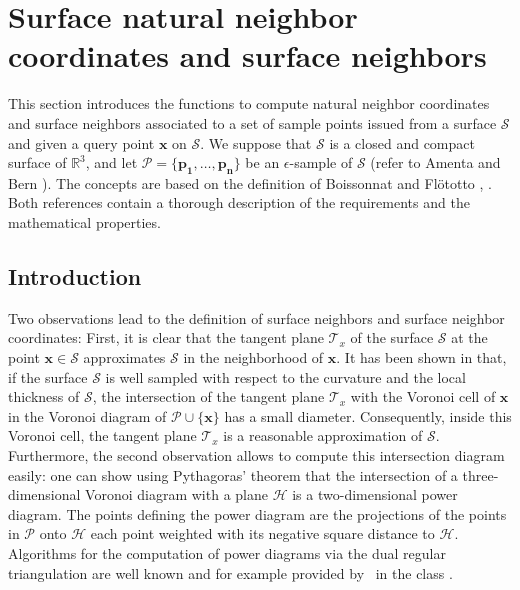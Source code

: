 \section{Surface natural neighbor coordinates and surface neighbors}\label{sec:surface}

This section introduces the functions to compute natural neighbor
coordinates and surface neighbors associated to a set of sample points
issued from a surface $\mathcal{S}$ and given a query point
$\mathbf{x}$ on $\mathcal{S}$. We suppose that $\mathcal{S}$ is a
closed and compact surface of $\mathbb{R}^3$, and let $\mathcal{P}=
\{\mathbf{p_1}, \ldots,\mathbf{p_n}\}$ be an $\epsilon$-sample of
$\mathcal{S}$ (refer to Amenta and Bern \cite{ab-srvf-99}). The
concepts are based on the definition of Boissonnat and Fl\"ototto
\cite{bf-lcss-02}, \cite{prisme-these-flototto}.  Both references
contain a thorough description of the requirements and the
mathematical properties.

\subsection{Introduction}

Two observations lead to the definition of surface neighbors and
surface neighbor coordinates: First, it is clear that the tangent
plane $\mathcal{T}_x$ of the surface $\mathcal{S}$ at the point
$\mathbf{x} \in \mathcal{S}$ approximates $\mathcal{S}$ in the
neighborhood of $\mathbf{x}$. It has been shown in \cite{bf-lcss-02}
that, if the surface $\mathcal{S}$ is well sampled with respect to the
curvature and the local thickness of $\mathcal{S}$, the intersection
of the tangent plane $\mathcal{T}_x$ with the Voronoi cell of
$\mathbf{x}$ in the Voronoi diagram of $\mathcal{P} \cup
\{\mathbf{x}\}$ has a small diameter.  Consequently, inside this
Voronoi cell, the tangent plane $\mathcal{T}_x$ is a reasonable
approximation of $\mathcal{S}$. Furthermore, the second observation
allows to compute this intersection diagram easily: one can show using
Pythagoras' theorem that the intersection of a three-dimensional
Voronoi diagram with a plane $\mathcal{H}$ is a two-dimensional power
diagram. The points defining the power diagram are the projections of
the points in $\mathcal{P}$ onto $\mathcal{H}$ each point weighted
with its negative square distance to $\mathcal{H}$. Algorithms for the
computation of power diagrams via the dual regular triangulation are
well known and for example provided by \cgal\ in the class
.

